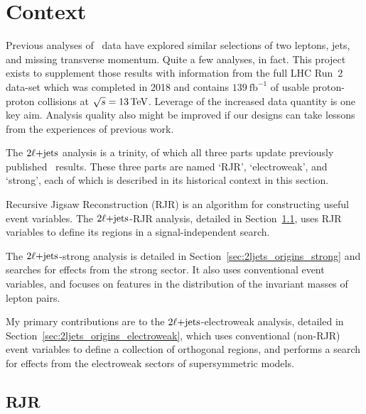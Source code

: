 \clearpage
\FloatBarrier
\section{Context}
\label{sec:2ljets_context}
Previous analyses of \atlas\ data have explored similar selections of
two leptons, jets, and missing transverse momentum.
Quite a few analyses, in fact.
This project exists to supplement those results with information from the full
LHC Run~2 data-set which was completed in 2018 and contains
$139~\mathrm{fb}^{-1}$ of usable proton-proton collisions at $\sqrt{s} = 13\,\eV[T]$.
Leverage of the increased data quantity is one key aim.
Analysis quality also might be improved if our designs can take lessons from
the experiences of previous work.


The $\twoljets$ analysis is a trinity,
of which all three parts update previously published \atlas\ results.
These three parts are named `RJR', `electroweak', and `strong', each of which
is described in its historical context in this section.

Recursive Jigsaw Reconstruction (RJR) is an algorithm for constructing useful
event variables.
The $\twoljets$-RJR analysis, detailed in Section~\ref{sec:2ljets_origins_rjr},
uses RJR variables to define its regions in a signal-independent search.

The $\twoljets$-strong analysis is
detailed in Section~\ref{sec:2ljets_origins_strong} and
searches for effects from the strong sector.
It also uses conventional event variables, and focuses on features in the
distribution of the invariant masses of lepton pairs.

My primary contributions are to the $\twoljets$-electroweak analysis,
detailed in Section~\ref{sec:2ljets_origins_electroweak},
which uses conventional (non-RJR) event variables to define a collection of
orthogonal regions, and performs a search for effects from the electroweak
sectors of supersymmetric models.


\subsection{RJR}
\label{sec:2ljets_origins_rjr}

